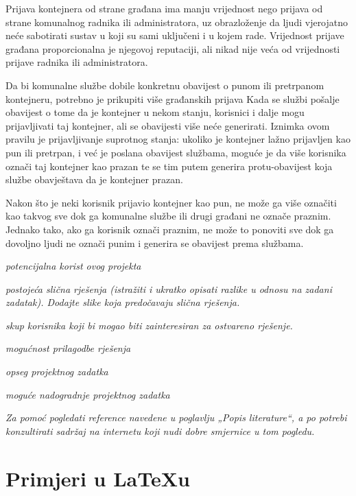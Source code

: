Prijava kontejnera od strane građana ima manju vrijednost nego prijava od strane komunalnog radnika ili administratora, uz obrazloženje da ljudi vjerojatno neće sabotirati sustav u koji su sami uključeni i u kojem rade. Vrijednost prijave građana proporcionalna je njegovoj reputaciji, ali nikad nije veća od vrijednosti prijave radnika ili administratora. 

Da bi komunalne službe dobile konkretnu obavijest o punom ili pretrpanom kontejneru, potrebno je prikupiti više građanskih prijava Kada se službi pošalje obavijest o tome da je kontejner u nekom stanju, korisnici i dalje mogu prijavljivati taj kontejner, ali se obavijesti više neće generirati. Iznimka ovom pravilu je prijavljivanje suprotnog stanja: ukoliko je kontejner lažno prijavljen kao pun ili pretrpan, i već je poslana obavijest službama, moguće je da više korisnika označi taj kontejner kao prazan te se tim putem generira protu-obavijest koja službe obavještava da je kontejner prazan.

Nakon što je neki korisnik prijavio kontejner kao pun, ne može ga više označiti kao takvog sve dok ga komunalne službe ili drugi građani ne označe praznim. Jednako tako, ako ga korisnik označi praznim, ne može to ponoviti sve dok ga dovoljno ljudi ne označi punim i generira se obavijest prema službama.\\


\begin{packed_item}
	\item \textit{potencijalna korist ovog projekta}
	\item \textit{postojeća slična rješenja (istražiti i ukratko opisati razlike u odnosu na zadani zadatak). Dodajte slike koja predočavaju slična rješenja.}
	\item \textit{skup korisnika koji bi mogao biti zainteresiran za ostvareno rješenje.}
	\item \textit{mogućnost prilagodbe rješenja }
	\item \textit{opseg projektnog zadatka}
	\item \textit{moguće nadogradnje projektnog zadatka}
\end{packed_item}
		
		\textit{Za pomoć pogledati reference navedene u poglavlju „Popis literature“, a po potrebi konzultirati sadržaj na internetu koji nudi dobre smjernice u tom pogledu.}
		\eject
		
		\section{Primjeri u LaTeXu}
		
